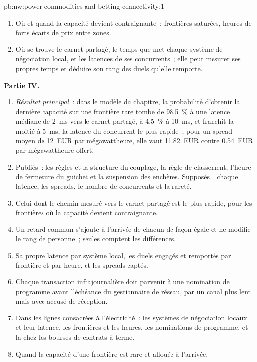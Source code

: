 \begin{solution}{pb:nw:power-commodities-and-betting-connectivity:1}
\begin{enumerate}[resume]
\item Où et quand la capacité devient contraignante~: frontières saturées, heures de forts écarts de prix entre zones.
\item Où se trouve le carnet partagé, le temps que met chaque système de négociation local, et les latences de ses concurrents~; elle peut mesurer ses propres temps et
  déduire son rang des duels qu'elle remporte.
\end{enumerate}
\textbf{Partie IV.}
\begin{enumerate}[resume]
\item \emph{Résultat principal}~: dans le modèle du chapitre, la probabilité d'obtenir la dernière capacité sur une frontière rare tombe de 98.5~\%
  à une latence médiane de \qty{2}{\milli\second} vers le carnet partagé, à 4.5~\% à \qty{10}{\milli\second}, et franchit la moitié à
  \qty{5}{\milli\second}, la latence du concurrent le plus rapide~; pour un spread moyen de 12~EUR par mégawattheure, elle vaut 11.82~EUR contre 0.54~EUR par
  mégawattheure offert.
\item Publiés~: les règles et la structure du couplage, la règle de classement, l'heure de fermeture du guichet et la suspension des enchères. Supposés~: chaque latence,
  les spreads, le nombre de concurrents et la rareté.
\item Celui dont le chemin mesuré vers le carnet partagé est le plus rapide, pour les frontières où la capacité devient contraignante.
\item Un retard commun s'ajoute à l'arrivée de chacun de façon égale et ne modifie le rang de personne~; seules comptent les différences.
\item Sa propre latence par système local, les duels engagés et remportés par frontière et par heure, et les spreads captés.
\item Chaque transaction infrajournalière doit parvenir à une nomination de programme avant l'échéance du gestionnaire de réseau, par un canal plus lent mais avec accusé de réception.
\item Dans les lignes consacrées à l'électricité~: les systèmes de négociation locaux et leur latence, les frontières et les heures, les nominations de programme, et la  chez les bourses de contrats à terme.
\item Quand la capacité d'une frontière est rare et allouée à l'arrivée.
\end{enumerate}
\end{solution}

